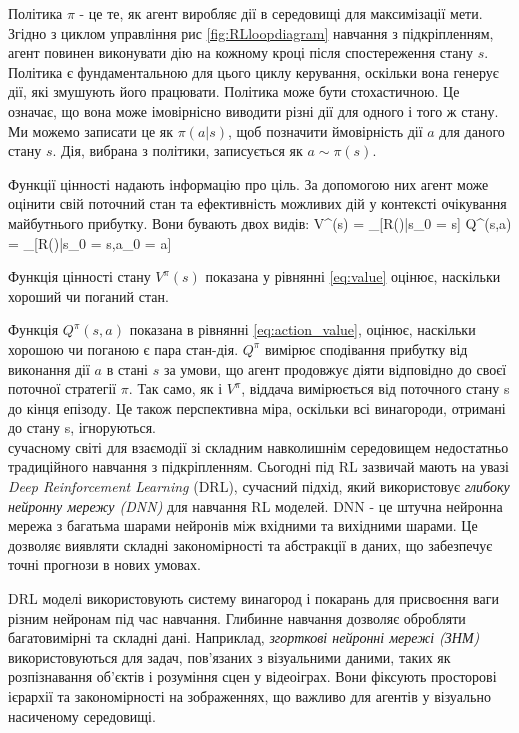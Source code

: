  \par Політика $\pi$ - це те, як агент виробляє дії в середовищі для максимізації мети. 
 Згідно з циклом управління рис \ref{fig:RLloopdiagram} навчання з підкріпленням, агент повинен виконувати 
 дію на кожному кроці після спостереження стану $s$. Політика є фундаментальною для цього циклу керування, 
 оскільки вона генерує дії, які змушують його працювати. Політика може бути стохастичною. Це означає, що вона 
 може імовірнісно виводити різні дії для одного і того ж стану. Ми можемо записати це як $\pi(a|s)$, щоб 
 позначити ймовірність дії $a$ для даного стану $s$. Дія, вибрана з політики, записується як $a \sim \pi(s)$.
 \par Функції цінності надають інформацію про ціль. За допомогою них агент може оцінити свій поточний стан та 
 ефективність можливих дій у контексті очікування майбутнього прибутку. Вони бувають двох видів:
  V^{\pi}(s) = \EX_{\pi}[R(\tau)|s_0 = s] \eq
   Q^{\pi}(s,a) = \EX_{\pi}[R(\tau)|s_0 = s,a_0 = a] \eq
  \par Функція цінності стану $V^{\pi}(s)$ показана у рівнянні \ref{eq:value} оцінює, наскільки хороший чи поганий стан.
  \par Функція $Q^{\pi}(s,a)$ показана в рівнянні \ref{eq:action_value}, оцінює, наскільки хорошою чи поганою є пара стан-дія. 
  $Q^{\pi}$ вимірює сподівання прибутку від виконання дії $a$ в стані $s$ за умови, що агент продовжує діяти 
  відповідно до своєї поточної стратегії $\pi$. Так само, як і $V^{\pi}$, віддача вимірюється від поточного стану s до кінця 
  епізоду. Це також перспективна міра, оскільки всі винагороди, отримані до стану s, ігноруються.\\

  сучасному світі для взаємодії зі складним навколишнім середовищем недостатньо
   традиційного навчання з підкріпленням. Сьогодні під RL заз\-вичай мають на увазі 
   {\em Deep Reinforcement Learning} (DRL), сучасний підхід, який використовує {\em глибоку нейронну
    мережу (DNN)} для навчання RL моделей. DNN - це штучна нейронна мережа з багатьма
     шарами нейронів між вхідними та вихідними шарами. Це дозволяє виявляти складні
      закономірності та абстракції в даних, що забезпечує точні прогнози в нових умовах.

DRL моделі використовують систему винагород і покарань для присвоєння ваги різним 
нейронам під час навчання. Глибинне навчання дозволяє обробляти багатовимірні та складні 
дані. Наприклад, {\em згорткові нейронні мережі (ЗНМ)} використовуються для задач, пов'язаних 
з візуальними даними, таких як розпізнавання об'єктів і розуміння сцен у відеоіграх. Вони
 фіксують просторові ієрархії та закономірності на зображеннях, що важливо для агентів у 
 візуально насиченому середовищі.
